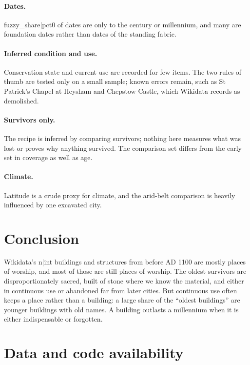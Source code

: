 \documentclass[11pt,a4paper]{article}
\begin{document}
\paragraph{Dates.} {{fuzzy_share|pct0}} of dates are only to the century or millennium, and many are foundation dates rather than dates of the standing fabric.

\paragraph{Inferred condition and use.} Conservation state and current use are recorded for few items. The two rules of thumb are tested only on a small sample; known errors remain, such as St Patrick's Chapel at Heysham and Chepstow Castle, which Wikidata records as demolished.

\paragraph{Survivors only.} The recipe is inferred by comparing survivors; nothing here measures what was lost or proves why anything survived. The comparison set differs from the early set in coverage as well as age.

\paragraph{Climate.} Latitude is a crude proxy for climate, and the arid-belt comparison is heavily influenced by one excavated city.

\section{Conclusion}

Wikidata's {{n|int}} buildings and structures from before AD 1100 are mostly places of worship, and most of those are still places of worship. The oldest survivors are disproportionately sacred, built of stone where we know the material, and either in continuous use or abandoned far from later cities. But continuous use often keeps a place rather than a building: a large share of the ``oldest buildings'' are younger buildings with old names. A building outlasts a millennium when it is either indispensable or forgotten.

\section*{Data and code availability}
\end{document}
